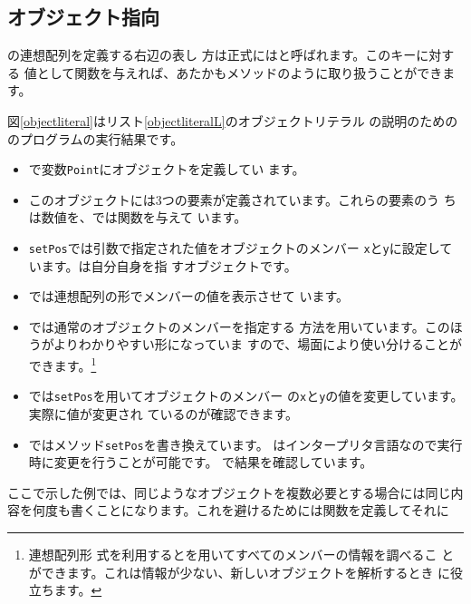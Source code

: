	\subsection{オブジェクト指向\JS}
\JS の連想配列を定義する右辺の表し
方は正式にはと呼ばれます。このキーに対する
値として関数を与えれば、あたかもメソッドのように取り扱うことができます。

図\ref{objectliteral}はリスト\ref{objectliteralL}のオブジェクトリテラル
の説明のための\JS のプログラムの実行結果です。


\begin{itemize}
 \item {}で変数\texttt{Point}にオブジェクトを定義してい
       ます。
 \item このオブジェクトには3つの要素が定義されています。これらの要素のう
       ちは数値を、では関数を与えて
       います。
 \item \texttt{setPos}では引数で指定された値をオブジェクトのメンバー
       \texttt{x}と\texttt{y}に設定しています。は自分自身を指
       すオブジェクトです。
 \item {}では連想配列の形でメンバーの値を表示させて
       います。
 \item {}では通常のオブジェクトのメンバーを指定する
       方法を用いています。このほうがよりわかりやすい形になっていま
       すので、場面により使い分けることができます。\footnote{連想配列形
       式を利用するとを用いてすべてのメンバーの情報を調べるこ
       とができます。これは情報が少ない、新しいオブジェクトを解析するとき
       に役立ちます。}
 \item {}では\texttt{setPos}を用いてオブジェクトのメンバー
       の\texttt{x}と\texttt{y}の値を変更しています。実際に値が変更され
       ているのが確認できます。
 \item {}ではメソッド\texttt{setPos}を書き換えています。
       \JS はインタープリタ言語なので実行時に変更を行うことが可能です。
       で結果を確認しています。       
\end{itemize}
ここで示した例では、同じようなオブジェクトを複数必要とする場合には同じ内
容を何度も書くことになります。これを避けるためには関数を定義してそれに
